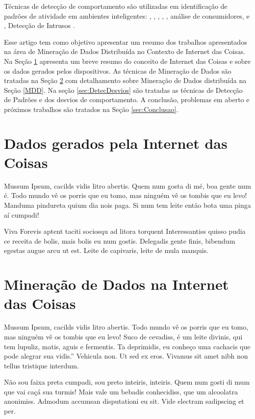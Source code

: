 \documentclass[12pt]{article}
\begin{document}
Técnicas de detecção de comportamento são utilizadas em identificação de padrões de atividade em ambientes inteligentes: \cite{000-062}, \cite{008-000}, \cite{009-000}, \cite{009-038}, \cite{010-000}, análise de consumidores, \cite{000-111} e \cite{000-123}, Detecção de Intrusos \cite{004-000}.

Esse artigo tem como objetivo apresentar um resumo dos trabalhos apresentados na área de Mineração de Dados Distribuída no Contexto de Internet das Coisas. Na Seção \ref{sec:dadosIoT} apresenta um breve resumo do conceito de Internet das Coisas e sobre os dados gerados pelos dispositivos. As técnicas de Mineração de Dados são tratadas na Seção \ref{sec:MDIoT} com detalhamento sobre Mineração de Dados distribuída na Seção \ref{MDD}. Na seção \ref{sec:DetecDesvios} são tratadas as técnicas de Detecção de Padrões e dos desvios de comportamento. A conclusão, problemas em aberto e próximos trabalhos são tratados na Seção  \ref{sec:Conclusao}.

\section{Dados gerados pela Internet das Coisas} \label{sec:dadosIoT}

Mussum Ipsum, cacilds vidis litro abertis. Quem num gosta di mé, boa gente num é. Todo mundo vê os porris que eu tomo, mas ninguém vê os tombis que eu levo! Manduma pindureta quium dia nois paga. Si num tem leite então bota uma pinga aí cumpadi!

Viva Forevis aptent taciti sociosqu ad litora torquent Interessantiss quisso pudia ce receita de bolis, mais bolis eu num gostis. Delegadis gente finis, bibendum egestas augue arcu ut est. Leite de capivaris, leite de mula manquis.

\section{Mineração de Dados na Internet das Coisas} \label{sec:MDIoT}

Mussum Ipsum, cacilds vidis litro abertis. Todo mundo vê os porris que eu tomo, mas ninguém vê os tombis que eu levo! Suco de cevadiss, é um leite divinis, qui tem lupuliz, matis, aguis e fermentis. Ta deprimidis, eu conheço uma cachacis que pode alegrar sua vidis.” Vehicula non. Ut sed ex eros. Vivamus sit amet nibh non tellus tristique interdum.

Não sou faixa preta cumpadi, sou preto inteiris, inteiris. Quem num gosti di mum que vai caçá sua turmis! Mais vale um bebadis conhecidiss, que um alcoolatra anonimiss. Admodum accumsan disputationi eu sit. Vide electram sadipscing et per. 
\end{document}
